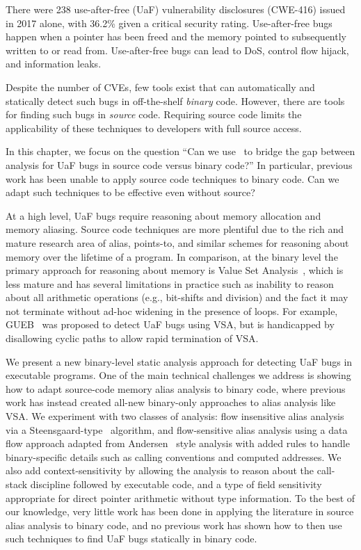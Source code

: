 There were 238 use-after-free (UaF) vulnerability disclosures (CWE-416) issued in 2017 alone, with 36.2\% given a critical security
rating.
Use-after-free bugs happen when a pointer has been freed and the memory pointed to subsequently written to or read from.
Use-after-free bugs can lead to DoS, control flow hijack, and information leaks.

Despite the number of CVEs, few tools exist that can automatically and statically detect such bugs in off-the-shelf \emph{binary} code.
However, there are tools for finding such bugs in \emph{source} code.
Requiring source code limits the applicability of these techniques to developers with full source access.

In this chapter, we focus on the question
``Can we use \sysname\ to bridge the gap between analysis for UaF bugs in source code versus binary code?''
In particular, previous work has been unable to apply source code techniques to binary code.
Can we adapt such techniques to be effective even without source?

At a high level, UaF bugs require reasoning about memory allocation and memory aliasing.
Source code techniques are more plentiful due to the rich and mature research area of alias, points-to, and similar schemes for reasoning about memory over the lifetime of a program.
In comparison, at the binary level the primary approach for reasoning about memory is Value Set Analysis~\cite{vsa}, which is less mature and has several limitations in practice such as inability to reason about all arithmetic operations (e.g., bit-shifts and division) and the fact it may not terminate without ad-hoc widening in the presence of loops.
For example, GUEB~\cite{gueb} was proposed to detect UaF bugs using VSA, but is handicapped by disallowing cyclic paths to allow rapid termination of VSA.

We present a new binary-level static analysis approach for detecting UaF bugs in executable programs.
One of the main technical challenges we address is showing how to adapt source-code memory alias analysis to binary code, where previous work has instead created all-new binary-only approaches to alias
analysis like VSA.
We experiment with two classes of analysis: flow insensitive alias analysis via a Steensgaard-type~\cite{steensgaard-alias} algorithm, and  flow-sensitive alias analysis using a data flow approach adapted from Andersen~\cite{andersen} style analysis with added rules to handle binary-specific details such as calling conventions and computed addresses.
We also add context-sensitivity by allowing the analysis to reason about the call-stack discipline followed by executable code, and a type of field sensitivity appropriate for direct pointer arithmetic without type information.
To the best of our knowledge, very little work has been done in applying the literature in source alias analysis to binary code, and no previous work has shown how to then use such techniques to find UaF bugs statically in binary code.

